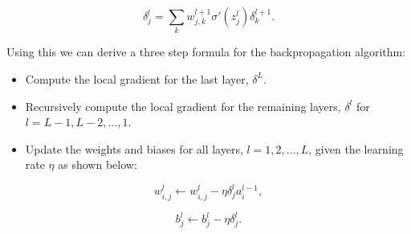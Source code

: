 \begin{equation}
    \label{eq:localgradient2}
    \delta_j^l = \sum_k w_{j,k}^{l+1}\sigma'(z_j^l)\delta_k^{l+1}.
\end{equation}

Using this we can derive a three step formula for the backpropagation algorithm:
\begin{itemize}
    \item Compute the local gradient for the last layer, $\delta^L$.
    \item Recursively compute the local gradient for the remaining layers, $\delta^l$ for $l=L-1, L-2, ..., 1$.
    \item Update the weights and biases for all layers, $l=1, 2, ..., L$, given the learning rate $\eta$ as shown below: 
\end{itemize}

\begin{equation*}
    w_{i,j}^{l} \leftarrow w_{i,j}^{l} - \eta \delta_j^l a_i^{l-1},
\end{equation*}


\begin{equation*}
    b_j^l \leftarrow b_j^l - \eta \delta_j^l.
\end{equation*}
